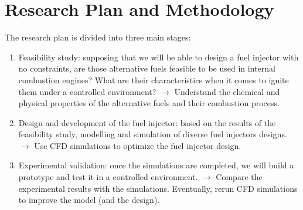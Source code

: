\section{Research Plan and Methodology}
\label{sec:research_plan_and_methodology}

The research plan is divided into three main stages:

\begin{enumerate}
    \item Feasibility study: supposing that we will be able to design a fuel injector with no constraints, are those alternative fuels feasible to be used in internal combustion engines? What are their characteristics when it comes to ignite them under a controlled environment? $\rightarrow$ Understand the chemical and physical properties of the alternative fuels and their combustion process.
    \item Design and development of the fuel injector: based on the results of the feasibility study, modelling and simulation of diverse fuel injectors designs. $\rightarrow$ Use CFD simulations to optimize the fuel injector design.
    \item Experimental validation: once the simulations are completed, we will build a prototype and test it in a controlled environment. $\rightarrow$ Compare the experimental results with the simulations. Eventually, rerun CFD simulations to improve the model (and the design).
\end{enumerate}
